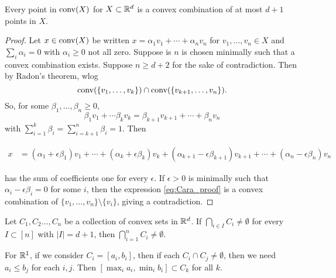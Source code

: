 \begin{theorem}
Every point in $\operatorname{conv}(X)$ for $X\subset \mathbb{R}^d$ is a convex combination of at most $d+1$ points in $X$.
\end{theorem}
\begin{proof}	
Let $x\in \operatorname{conv}(X)$ be written $x = \alpha_1 v_1 + \dotsb + \alpha_n v_n$ for $v_1,\dotsc,v_n\in X$ and $\sum_i \alpha_i=0$ with $\alpha_i\geq 0$ not all zero. Suppose is $n$ is chosen minimally such that a convex combination exists. Suppose $n\geq d+2$ for the sake of contradiction. Then by Radon's theorem, wlog
\[
\operatorname{conv}(\{v_1,\dotsc,v_k\})\cap \operatorname{conv}(\{v_{k+1},\dotsc, v_n \}).
\]
So, for some $\beta_1,\dotsc,\beta_n\geq 0$,
\[
\beta_1 v_1 + \dotsb \beta_k v_k = \beta_{k+1} v_{k+1} + \dotsb + \beta_n v_n
\]
with $\sum_{i=1}^k \beta_i = \sum_{i=k+1}^n \beta_i = 1$. Then
\vspace{-\baselineskip}
\begin{fullwidth}
\begin{align}	
x &= (\alpha_1 + \epsilon \beta_1) v_1 + \dotsb + (\alpha_k + \epsilon \beta_k)v_k + (\alpha_{k+1} - \epsilon \beta_{k+1})v_{k+1}+ \dotsb +  (\alpha_n - \epsilon \beta_n)v_n \tag{$\star$} \label{eq:Cara_proof}
\end{align}
\end{fullwidth}
has the sum of coefficients one for every $\epsilon$. If $\epsilon>0$ is minimally such that $\alpha_i - \epsilon \beta_i=0$ for some $i$, then the expression \eqref{eq:Cara_proof} is a convex combination of $\{v_1,\dotsc,v_n\}\setminus \{v_i\}$, giving a contradiction.
\end{proof}
\begin{theorem}
Let $C_1,C_2\dotsc,C_n$ be a collection of convex sets in $\mathbb{R}^d$. If $\bigcap_{i\in I} C_i \neq \emptyset$ for every $I\subset [n]$ with $|I| = d+1$, then $\bigcap_{i=1}^n C_i \neq \emptyset$.
\end{theorem}
\begin{remark}
For $\mathbb{R}^1$, if we consider $C_i = [a_i,b_i]$, then if each $C_i\cap C_j\neq \emptyset$, then we need $a_i \leq b_j$ for each $i,j$. Then $[\max_i a_i, \min_i b_i] \subset C_k$ for all $k$.
\end{remark}

